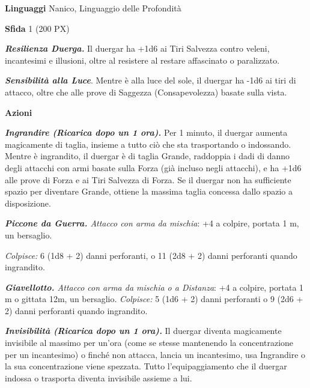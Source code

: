 \begin{multicols}{2}
\textbf{Linguaggi} Nanico, Linguaggio delle Profondità

\textbf{Sfida} 1 (200 PX)

\textit{\textbf{Resilienza Duerga.}} Il duergar ha +1d6 ai Tiri Salvezza contro veleni, incantesimi e illusioni, oltre al resistere al restare affascinato o paralizzato.

\textit{\textbf{Sensibilità alla Luce}}. Mentre è alla luce del sole, il duergar ha -1d6 ai tiri di attacco, oltre che alle prove di Saggezza (Consapevolezza) basate sulla vista.

\textbf{Azioni}

\textit{\textbf{Ingrandire (Ricarica dopo un 1 ora).}} Per 1 minuto, il duergar aumenta magicamente di taglia, insieme a tutto ciò che sta trasportando o indossando. Mentre è ingrandito, il duergar è di taglia Grande, raddoppia i dadi di danno degli attacchi con armi basate sulla Forza (già incluso negli attacchi), e ha +1d6 alle prove di Forza e ai Tiri Salvezza di Forza. Se il duergar non ha sufficiente spazio per diventare Grande, ottiene la massima taglia concessa dallo spazio a disposizione.

\textit{\textbf{Piccone da Guerra.} Attacco con arma da mischia}: +4 a colpire, portata 1 m, un bersaglio.

\textit{Colpisce:} 6 (1d8 + 2) danni perforanti, o 11 (2d8 + 2) danni perforanti quando ingrandito.

\textit{\textbf{Giavellotto.} Attacco con arma da mischia o a Distanza}: +4 a colpire, portata 1 m o gittata 12m, un bersaglio. \textit{Colpisce:} 5 (1d6 + 2) danni perforanti o 9 (2d6 + 2) danni
perforanti quando ingrandito.

\textit{\textbf{Invisibilità (Ricarica dopo un 1 ora).}} Il duergar diventa magicamente invisibile al massimo per un'ora (come se stesse mantenendo la concentrazione per un incantesimo) o finché non attacca, lancia un incantesimo, usa Ingrandire o la sua concentrazione viene spezzata. Tutto l'equipaggiamento che il duergar indossa o trasporta diventa invisibile assieme a lui.


\end{multicols}
